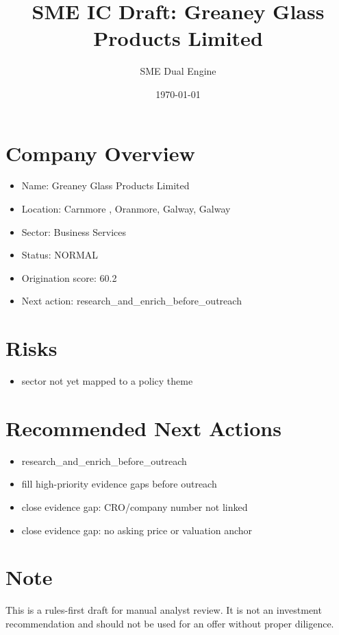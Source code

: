 \documentclass[11pt,a4paper]{article}
\title{SME IC Draft: Greaney Glass Products Limited}
\author{SME Dual Engine}
\date{\today}
\begin{document}
\maketitle
\section*{Company Overview}
\begin{itemize}[leftmargin=1.4em]
\item Name: Greaney Glass Products Limited
\item Location: Carnmore , Oranmore, Galway, Galway
\item Sector: Business Services
\item Status: NORMAL
\item Origination score: 60.2
\item Next action: research\_and\_enrich\_before\_outreach
\end{itemize}
\section*{Risks}
\begin{itemize}[leftmargin=1.4em]
\item sector not yet mapped to a policy theme
\end{itemize}
\section*{Recommended Next Actions}
\begin{itemize}[leftmargin=1.4em]
\item research\_and\_enrich\_before\_outreach
\item fill high-priority evidence gaps before outreach
\item close evidence gap: CRO/company number not linked
\item close evidence gap: no asking price or valuation anchor
\end{itemize}
\section*{Note}
This is a rules-first draft for manual analyst review. It is not an investment
recommendation and should not be used for an offer without proper diligence.
\end{document}
